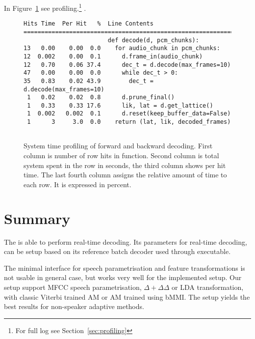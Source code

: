 In Figure~\ref{fig:cpu_profile} see profiling.\footnote{For full log see Section~\ref{sec:profiling}}
.

\begin{figure}[!htp]
    \begin{center}
    \begin{verbatim}
Hits Time  Per Hit   %  Line Contents
==============================================================
                        def decode(d, pcm_chunks):
13   0.00    0.00  0.0    for audio_chunk in pcm_chunks:
12  0.002    0.00  0.1      d.frame_in(audio_chunk)
12   0.70    0.06 37.4      dec_t = d.decode(max_frames=10)
47   0.00    0.00  0.0      while dec_t > 0:
35   0.83    0.02 43.9        dec_t = d.decode(max_frames=10)
 1   0.02    0.02  0.8      d.prune_final()
 1   0.33    0.33 17.6      lik, lat = d.get_lattice()
 1  0.002   0.002  0.1      d.reset(keep_buffer_data=False)
 1      3     3.0  0.0    return (lat, lik, decoded_frames)
        
    \end{verbatim}
    \caption{System time profiling of forward and backward decoding.
First column is number of row hits in  function. Second column
is total system spent in the row in seconds, the third column shows per hit time. 
The last fourth column assigns the relative amount of time to each row. 
It is expressed in percent.}
    \label{fig:cpu_profile} 
    \end{center}
\end{figure}


\section{Summary}
\label{sec:onl_summary}
The  is able to perform real-time decoding.
Its parameters for real-time decoding, 
can be setup based on its reference batch decoder  used through  executable.

The minimal interface for speech parametrisation and feature transformations is not usable in general case,
but works very well for the implemented setup.
Our setup support \ac{MFCC} speech parametrisation, $\Delta+\Delta\Delta$ or \ac{LDA} transformation, with
classic Viterbi trained \ac{AM} or \ac{AM} trained using \ac{bMMI}.
The setup yields the best results for non-speaker adaptive methods.


